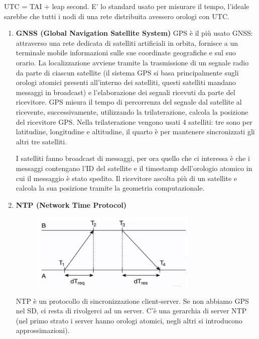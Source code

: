 \documentclass[12pt,italian]{report}
\begin{document}
\bigbreak
\noindent UTC = TAI + leap second. E' lo standard usato per misurare il tempo, l'ideale sarebbe che tutti i nodi di una rete distribuita avessero orologi con UTC. 
\newpage
\begin{enumerate}
    \item \textbf{GNSS (Global Navigation Satellite System)} 
    \bigbreak
    GPS è il più usato GNSS: attraverso una rete dedicata di satelliti artificiali in orbita, fornisce a un terminale mobile informazioni sulle sue coordinate geografiche e sul suo orario. La localizzazione avviene tramite la trasmissione di un segnale radio da parte di ciascun satellite (il sistema GPS si basa principalmente sugli orologi atomici presenti all'interno dei satelliti, questi  satelliti mandano messaggi in broadcast) e l'elaborazione dei segnali ricevuti da parte del ricevitore. GPS misura il tempo di percorrenza del segnale dal satellite al ricevente, successivamente, utilizzando la trilaterazione, calcola la posizione del ricevitore GPS. Nella trilaterazione vengono usati 4 satelliti: tre sono per latitudine, longitudine e altitudine, il quarto è per mantenere sincronizzati gli altri tre satelliti. 
    
    I satelliti fanno broadcast di messaggi, per ora quello che ci interessa è che i messaggi contengano l'ID del satellite e il timestamp dell'orologio atomico in cui il messaggio è stato spedito. Il ricevitore ascolta più di un satellite e calcola la sua posizione tramite la geometria computazionale. 
    
    \item \textbf{NTP (Network Time Protocol)} 
    \begin{figure}[h]
    \centering
    \includegraphics[width=80mm]{img/ntp.png}
    \end{figure}
    \bigbreak
    NTP è un protocollo di sincronizzazione client-server. Se non abbiamo GPS nel SD, ci resta di rivolgerci ad un server. C'è una gerarchia di server NTP (nel primo strato i server hanno orologi atomici, negli altri si introducono approssimazioni). 


\end{enumerate}
\end{document}
